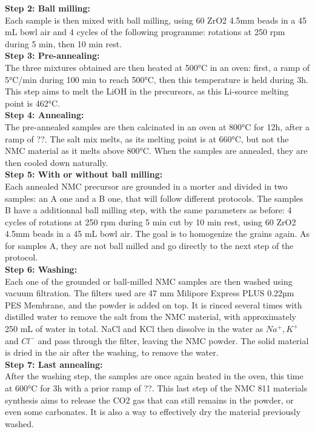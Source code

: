 \documentclass{article}
\begin{document}
\textbf{Step 2: Ball milling:}\\
Each sample is then mixed with ball milling, using 60 ZrO2 4.5mm beads in a 45 mL bowl air and 4 cycles of the following programme: rotations at 250 rpm during 5 min, then 10 min rest. \\

\textbf{Step 3: Pre-annealing:}\\
The three mixtures obtained are then heated at 500°C in an oven: first, a ramp of 5°C/min during 100 min to reach 500°C, then this temperature is held during 3h. This step aims to melt the LiOH in the precursors, as this Li-source melting point is 462°C. \cite{precalci} \\

\textbf{Step 4: Annealing:}\\
The pre-annealed samples are then calcinated in an oven at 800°C for 12h, after a ramp of ??. The salt mix melts, as its melting point is at 660°C, but not the NMC material as it melts above 800°C. When the samples are annealed, they are then cooled down naturally.\\

\textbf{Step 5: With or without ball milling:}\\
Each annealed NMC precursor are grounded in a morter and divided in two samples: an  A one and a B one, that will follow different protocols. The samples B have a additionnal ball milling step, with the same parameters as before: 4 cycles of rotations at 250 rpm during 5 min cut by 10 min rest, using 60 ZrO2 4.5mm beads in a 45 mL bowl air. The goal is to homogenize the grains again. As for samples A, they are not ball milled and go directly to the next step of the protocol.\\

\textbf{Step 6: Washing:}\\
Each one of the grounded or ball-milled NMC samples are then washed using vacuum filtration. The filters used are 47 mm Milipore Express PLUS 0.22µm PES Membrane, and the powder is added on top. It is rinced several times with distilled water to remove the salt from the NMC material, with approximately 250 mL of water in total. NaCl and KCl then dissolve in the water as  $Na^+, K^+$ and $ Cl^-$ and pass through the filter, leaving the NMC powder. The solid material is dried in the air after the washing, to remove the water. \\

\textbf{Step 7: Last annealing:}\\
After the washing step, the samples are once again heated in the oven, this time at 600°C for 3h with a prior ramp of ??. This last step of the NMC 811 materials synthesis aims to release the CO2 gas that can still remains in the powder, or even some carbonates. It is also a way to effectively dry the material previously washed.\\
\end{document}
